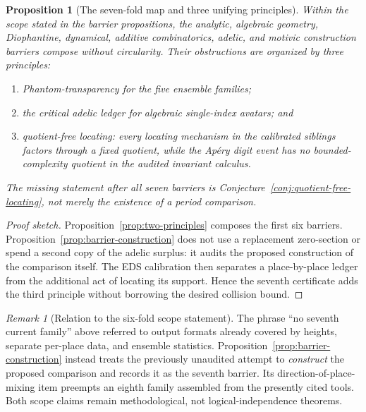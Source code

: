 \documentclass[11pt]{amsart}
\theoremstyle{plain}
\newtheorem{proposition}{Proposition}
\theoremstyle{remark}
\newtheorem{remark}{Remark}
\begin{document}
\begin{proposition}[The seven-fold map and three unifying principles]
\label{prop:sevenfold-map}
Within the scope stated in the barrier propositions, the analytic,
algebraic geometry, Diophantine, dynamical, additive combinatorics,
adelic, and motivic construction barriers compose without circularity.
Their obstructions are organized by three principles:
\begin{enumerate}
\item \emph{Phantom-transparency} for the five ensemble families;
\item the \emph{critical adelic ledger} for algebraic single-index
avatars; and
\item \emph{quotient-free locating}: every locating mechanism in the
calibrated siblings factors through a fixed quotient, while the
Ap\'ery digit event has no bounded-complexity quotient in the audited
invariant calculus.
\end{enumerate}
The missing statement after all seven barriers is
Conjecture~\ref{conj:quotient-free-locating}, not merely the existence
of a period comparison.
\end{proposition}

\begin{proof}[Proof sketch]
Proposition~\ref{prop:two-principles} composes the first six barriers.
Proposition~\ref{prop:barrier-construction} does not use a replacement
zero-section or spend a second copy of the adelic surplus: it audits
the proposed construction of the comparison itself.  The EDS
calibration then separates a place-by-place ledger from the additional
act of locating its support.  Hence the seventh certificate adds the
third principle without borrowing the desired collision bound.
\end{proof}

\begin{remark}[Relation to the six-fold scope statement]
The phrase ``no seventh current family'' above referred to output
formats already covered by heights, separate per-place data, and
ensemble statistics.  Proposition~\ref{prop:barrier-construction}
instead treats the previously unaudited attempt to \emph{construct}
the proposed comparison and records it as the seventh barrier.
Its direction-of-place-mixing item preempts an eighth family assembled
from the presently cited tools.
Both scope claims remain methodological, not logical-independence
theorems.
\end{remark}
\end{document}
